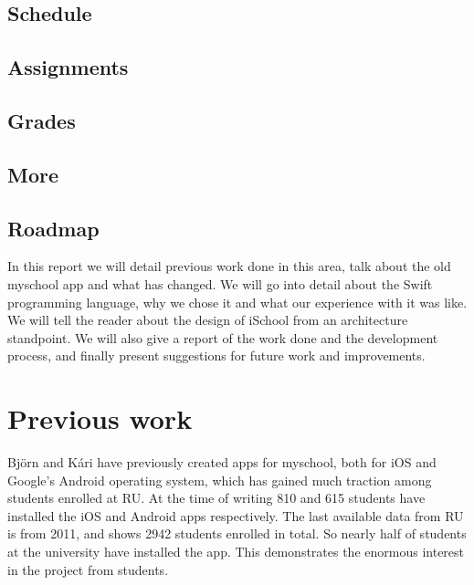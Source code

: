 \documentclass[pdftex, DIV=calc, paper=a4, fontsize=11pt, twocolumn]{scrartcl}	 %
\begin{document}
\subsection*{Schedule}

\lipsum[8]

\subsection*{Assignments}

\lipsum[8]

\subsection*{Grades}

\lipsum[8]

\subsection*{More}

\lipsum[8]


\subsection*{Roadmap}

In this report we will detail previous work done in this area, talk about the old myschool app
and what has changed. We will go into detail about the Swift programming language, why we chose it
and what our experience with it was like. We will tell the reader about the design of iSchool from
an architecture standpoint. We will also give a report of the work done and the development process,
and finally present suggestions for future work and improvements.



\section*{Previous work}

Björn and Kári have previously created apps for myschool, both for iOS and Google's Android operating
system, which has gained much traction among students enrolled at RU. At the time of writing 810 
and 615 students have installed the iOS and Android apps respectively. The last available data 
from RU is from 2011, and shows 2942 students enrolled in total. So nearly half of students at the 
university have installed the app. This demonstrates the enormous interest in the project from
students.
\end{document}
